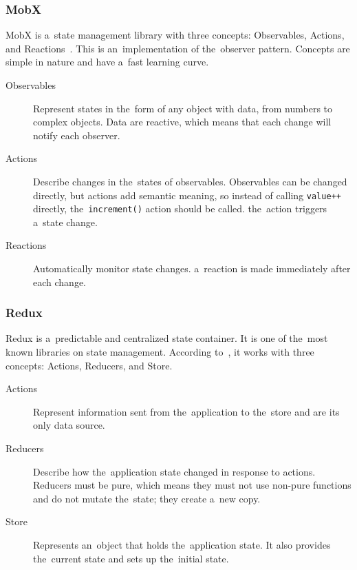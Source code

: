 \subsubsection{MobX}

MobX is a~state management library with three concepts: Observables, Actions, and Reactions~\cite{a2022_mobxdart}.
This is an~implementation of the~observer pattern.
Concepts are simple in nature and have a~fast learning curve.

\begin{description}
    \item[Observables] Represent states in the~form of any object with data, from numbers to complex objects.
    Data are reactive, which means that each change will notify each observer.
    \item[Actions] Describe changes in the~states of observables. Observables can be changed directly, but actions add semantic meaning, so instead of calling \texttt{value++} directly, the~\texttt{increment()} action should be called. the~action triggers a~state change.
    \item[Reactions] Automatically monitor state changes. a~reaction is made immediately after each change.
\end{description}

\subsubsection{Redux}

Redux is a~predictable and centralized state container.
It is one of the~most known libraries on state management.
According to~\cite{brianegan_2021_fluttercommunityreduxdart}, it works with three concepts: Actions, Reducers, and Store.

\begin{description}
    \item[Actions] Represent information sent from the~application to the~store and are its only data source.
    \item[Reducers] Describe how the~application state changed in response to actions.
    Reducers must be pure, which means they must not use non-pure functions and do not mutate the~state; they create a~new copy.
    \item[Store] Represents an~object that holds the~application state.
    It also provides the~current state and sets up the~initial state.
\end{description}

